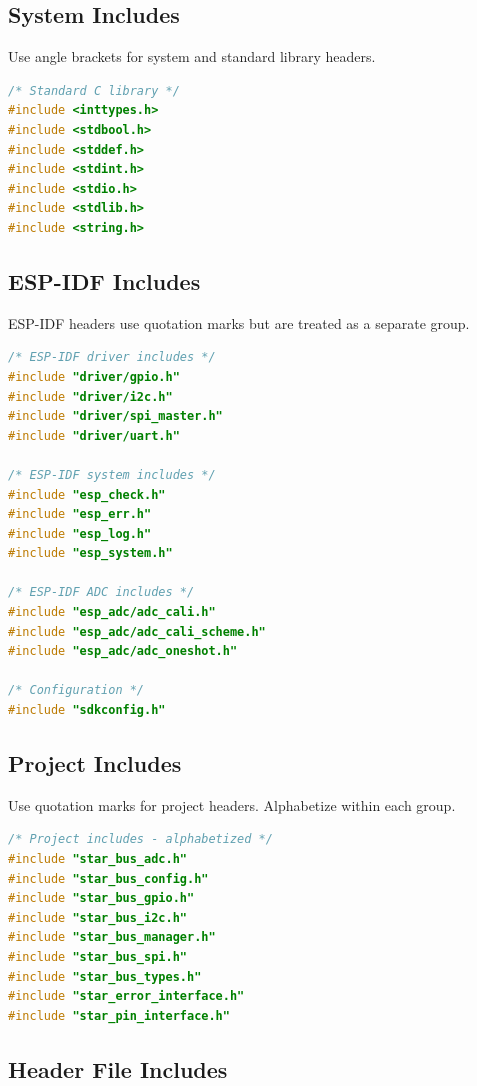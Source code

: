 \subsection{System Includes}

Use angle brackets for system and standard library headers.

\begin{lstlisting}[language=C]
/* Standard C library */
#include <inttypes.h>
#include <stdbool.h>
#include <stddef.h>
#include <stdint.h>
#include <stdio.h>
#include <stdlib.h>
#include <string.h>
\end{lstlisting}

\subsection{ESP-IDF Includes}

ESP-IDF headers use quotation marks but are treated as a separate group.

\begin{lstlisting}[language=C]
/* ESP-IDF driver includes */
#include "driver/gpio.h"
#include "driver/i2c.h"
#include "driver/spi_master.h"
#include "driver/uart.h"

/* ESP-IDF system includes */
#include "esp_check.h"
#include "esp_err.h"
#include "esp_log.h"
#include "esp_system.h"

/* ESP-IDF ADC includes */
#include "esp_adc/adc_cali.h"
#include "esp_adc/adc_cali_scheme.h"
#include "esp_adc/adc_oneshot.h"

/* Configuration */
#include "sdkconfig.h"
\end{lstlisting}

\subsection{Project Includes}

Use quotation marks for project headers. Alphabetize within each group.

\begin{lstlisting}[language=C]
/* Project includes - alphabetized */
#include "star_bus_adc.h"
#include "star_bus_config.h"
#include "star_bus_gpio.h"
#include "star_bus_i2c.h"
#include "star_bus_manager.h"
#include "star_bus_spi.h"
#include "star_bus_types.h"
#include "star_error_interface.h"
#include "star_pin_interface.h"
\end{lstlisting}

\subsection{Header File Includes}

